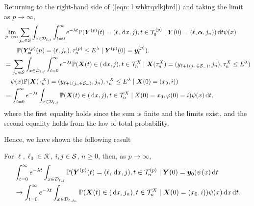 Returning to the right-hand side of (\ref{eqn: l whkrqvlkjbrd}) and taking the limit as \(p\to\infty\), 
\begin{align}
	&\lim_{p\to\infty} \sum_{j_n\in\mathcal S}
	\int_{x\in\mathcal{D}_{\ell,j}} \int_{t=0}^\infty e^{-\lambda t} \mathbb P({\boldsymbol Y}^{(p)}(t) = (\ell,\, \mathrm{d} x, j), 
	t\in\mathcal T_0^{(p)} \mid \nonumber 
	 \boldsymbol Y(0) = (\ell,\boldsymbol\alpha,j_n))\, \mathrm{d} t \psi(x)
	 \\&\qquad{}  \mathbb P(\bm{Y}_{\bm{\alpha}}^{(p)}(n) = (\ell, j_n), \tau_{n}^{(p)}\leq E^\lambda 
	 \mid \boldsymbol Y^{(p)}(0)=\boldsymbol y_0^{(p)}).\label{eqn: eieieie}
	 \\&=\sum_{j_n\in\mathcal S}\int_{x\in\mathcal{D}_{\ell,j}} \int_{t=0}^\infty e^{-\lambda t} \mathbb P(\boldsymbol X(t)\in(\, \mathrm{d} x, j), t\in\mathcal T_n^{X} \mid \boldsymbol X(\tau_n^X) = (y_{\ell+1(j_n\in\mathcal S_-)}, j_n),\nonumber 
	 \tau_n^X\leq E^\lambda ) 
	 \\&\quad{} \psi(x)\mathbb P(\boldsymbol X(\tau_n^X) = (y_{\ell+1(j_{n}\in\mathcal S_-)}, 
		j_n), \tau_{n}^X\leq E^\lambda
		\mid \boldsymbol X(0)=(x_0,i))\nonumber
	\\&= \int_{t=0}^\infty e^{-\lambda t}  \int_{x\in\mathcal{D}_{\ell,j}}\mathbb P(\boldsymbol X(t)\in(\, \mathrm{d} x, j), t\in\mathcal T_n^{X} 
	\mid X(0)=x_0, \varphi(0)=i)\psi(x)\, \mathrm{d} t,
\end{align}
where the first equality holds since the sum is finite and the limits exist, and the second equality holds from the law of total probability. 

Hence, we have shown the following result 
\begin{lem}\label{lem: LAkAKFnvnb mav h}
	For \(\ell,\ell_0\in\mathcal K\), \(i,j\in\mathcal{S}\), \(n\geq 0\), then, as \(p\to\infty\), 
	\begin{align} 
		&\int_{t=0}^\infty e^{-\lambda t}\int_{x\in\mathcal{D}_{\ell,j}}\mathbb P({\boldsymbol Y}^{(p)}(t) = (\ell,\, \mathrm{d} x, j), t\in\mathcal T_n^{(p)} \mid  \nonumber 
		\boldsymbol Y(0) = \boldsymbol y_0)\psi(x)\, \mathrm{d} t \nonumber
		\\&\to\int_{t=0}^\infty e^{-\lambda t}  \int_{x\in\mathcal{D}_{\ell,j_n}}\mathbb P(\boldsymbol X(t)\in(\, \mathrm{d} x, j_n), t\in\mathcal T_n^{X} 
		\mid \boldsymbol X(0)=(x_0,i))\psi(x)\, \mathrm{d} x\, \mathrm{d} t.
	\end{align}
\end{lem}

